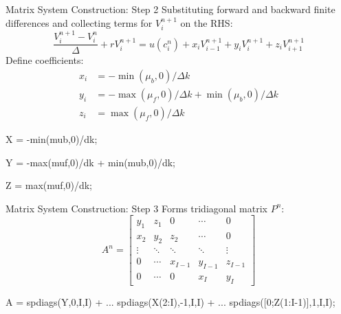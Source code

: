 \documentclass[]{beamer}
\newenvironment{code}{\begin{semiverbatim}\footnotesize}{\end{semiverbatim}}
\begin{document}
\begin{frame}{Matrix System Construction: Step 2}
    Substituting forward and backward finite differences and collecting terms for $V_i^{n+1}$ on the RHS:
    \begin{equation}
        \frac{V_i^{n+1} - V_i^n}{\Delta} + r V_i^{n+1} = u(c_i^n) + x_i V_{i-1}^{n+1} + y_i V_i^{n+1} + z_i V_{i+1}^{n+1} \tag{8}
    \end{equation}
    Define coefficients:
    \begin{align}
        x_i &= -\min(\mu_b,0)/\Delta k \tag{5} \\
        y_i &= -\max(\mu_f,0)/\Delta k + \min(\mu_b,0)/\Delta k \tag{6} \\
        z_i &= \max(\mu_f,0)/\Delta k \tag{7}
    \end{align}
    
    \begin{code}
    X = -min(mub,0)/dk;  %
    
    Y = -max(muf,0)/dk + min(mub,0)/dk;  %
    
    Z = max(muf,0)/dk;  %
    \end{code}
    
    
\end{frame}

\begin{frame}{Matrix System Construction: Step 3}
    Forms tridiagonal matrix $P^n$:
    \begin{equation}
        A^n = \begin{bmatrix}
            y_1 & z_1 & 0 & \cdots & 0\\
            x_2 & y_2 & z_2 & \cdots & 0\\
            \vdots & \ddots & \ddots & \ddots & \vdots\\
            0 & \cdots & x_{I-1} & y_{I-1} & z_{I-1}\\
            0 & \cdots & 0 & x_I & y_I
        \end{bmatrix} \tag{9}
    \end{equation}
    
    \begin{code}
    A = spdiags(Y,0,I,I) + ...    %
        spdiags(X(2:I),-1,I,I) + ... %
        spdiags([0;Z(1:I-1)],1,I,I); %
    \end{code}
\end{frame}
\end{document}
